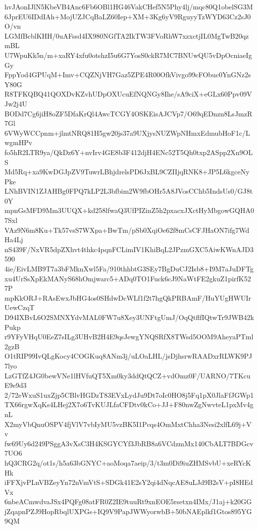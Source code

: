 hvJAonIJlN5KbeVB4Anc6Fb6OBl1HG46VakCHef5N5Phy4lj/mqc80Q1obelSG3M
6JprEU6IDdIAh+MojUZJCqBaLZ60Iep+XM+3Kg6yV9RguyyTzWYD63Cz2sJ0O/vn
LGMfBcblKHH/0uAFssd4IX980NGfTA2IkTW3FVoRhW7xzxctjIL0MgTwB20qzmBL
U7WpuKk5n/m+xaRY4xfu0otshzI5u6G7YosS0ckR7MC7BNUwQU5vDpOcniaeIgGy
FppYod4GPUqM+Imv+CQZNjVH7Gaz5ZPE4R00OfkVivgo99cFObuc0YnGNz2sY80G
R8TFKQBQ41QOXDvKZvhUDpOXUcuEfNQNGy8Ihe/sA9ciX+eGLx60Ppv09VJw2j4U
BODd7Cg6jiH8oZF5DfaKrQl4AwcTCGY4OSKEisAJCVp7/O69qEDnzn8LsJmzR7Gl
6VWyWCCpnm+jlmtNRQ81H5gw20js37a9UXjysNUZWpNHmxEdmubHoF1c/LwgmHPv
fo5hR2LTR9ya/QkDz6Y+nvIrv4GE8b3F412djH4ENc52T5Qh0txp2ASpp2Xn9OLS
Md5Rq+xa9KwDGJpZV9TuwrLBhjdrelsPD6JxBL9CZIIjqRNK8+JP5L6kgceNyPke
LNhBVIN1ZJAHBg0FPQ7kLP2L3bfbim2W9fbOHr5A8JVosCChb5IndsUs0/GJ8t0Y
mpnGsMFD9Mm3UUQX+kd258lfwaQ3UfPIZinZ5h2pxacxJXctHyMbgowGQHA07Sxl
VAz9N6m8Ku+Tk57vsS7WXpa+BwTm/pSb0XqiOe62f8mCsCFJHaON7ifg7WdHa4Lj
nS439F/NxVR5dpZXhvt4thkc4pqnFCLimIV1KhiBqL2JPzmGXC5AiwKWnAJD3590
4ie/EivLMB9T7a3bFMknXwl5Fa/910thhbtG3SEy7BgDuCJ2Isb8+I9M7aJuDFTg
xu4UrSsXpEkMANyS68hOmjwarc5+ADq0TO1Fuck6cJ9NaWtFE2gkuZ1pirfK527P
mpKkORJ+RAsEwxJbHG4os0SHdwDcWLf1f2t7hgQkPRBAmF/HuYUgHWUIrUewCzqT
D94IXBvL6O2SMNXYdvMAL0FW7u8Xey3UNFtgUmJ/OqQtflfIQtwTr9JWB42kPukp
r9YFyVHqU0EeZ7sILg3UHvB2H4E9qsJewgYNQSRfX8TWsd5OOM9AheyaPTml2gzB
O1tRIP99IvQLgKocy4COGKuq8ANm3j/uLOaLHL/jsDjhsrwRAADxrRLWK9PJ7lyo
LzGTfZ4JG0bewVNe1lHVfuQT5Xm0ky3ddQtQCZ+vdOmz0F/UARNO/7TKcuE9e9d3
2/72eWxuS1uxZjp5CBlvHGDzT83EVxLydJu9Dt7oIc0HO8j5Fq1pX0JlaFfJGWp1
TX66rgwXqKs4LHej2X7o6TvKUJLfaCFDtv0kCo+JJ+F80nwZgNwvteL1pxMv4gnL
X2myVbQnuOSPV4fjVlV7vbIyMU5vzBK5I1Pcqs4OmMxtChha3Nesi2xlfL69j+Vv
fw69Uy6d249PSggA3vXsC3H4KSGYCYf3JbRB8a6VCdzmMx140CbALT7BDGcv7UO6
hQ3CRG2q/ot1s/h5a63bGNYC+aoMoqa7aeip/3/t3m0Di9iuZHMSvbU+xeRYcKHk
iFFXjvPLnVBZeyYn72nVmVtS+SDGk41E2sY2qi4dNqcAE8uLJd9B2sV+pI8HEdVx
6nbeACmwdvaJSx4PQFg08atFR0Z2IE9tuuRt9xnEOE5rsetxn4IMx/J1aj+k20GG
jZqapnPZJ9HopRbqlUXPGs+IQ9V9PapJWWyorwbB+50bNAEplkf1Gtos895YG9QM
